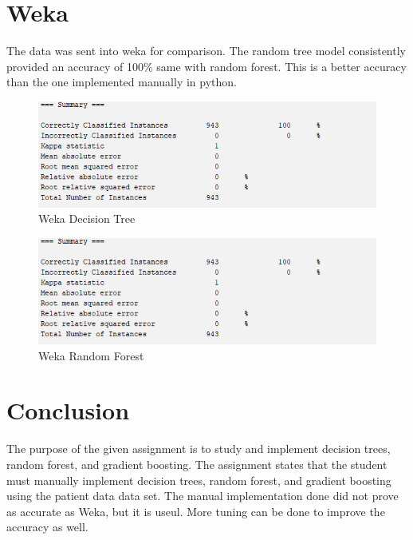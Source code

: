 \documentclass{article}
\begin{document}
\section{Weka}
The data was sent into weka for comparison. The random tree model consistently provided an accuracy of 100\% same with random forest. This is a better accuracy than the one implemented manually in python.
\begin{figure}
    \centering
    \includegraphics[width=0.5\linewidth]{c.png}
    \caption{Weka Decision Tree}
    \label{fig:enter-label}
\end{figure}
\begin{figure}
    \centering
    \includegraphics[width=0.5\linewidth]{d.png}
    \caption{Weka Random Forest}
    \label{fig:enter-label}
\end{figure}
\section{Conclusion}
The purpose of the given assignment is to study and implement decision trees, random forest, and gradient boosting. The assignment states that the student must manually implement decision trees, random forest, and gradient boosting using the patient data data set. The manual implementation done did not prove as accurate as Weka, but it is useul. More tuning can be done to improve the accuracy as well.
\end{document}
